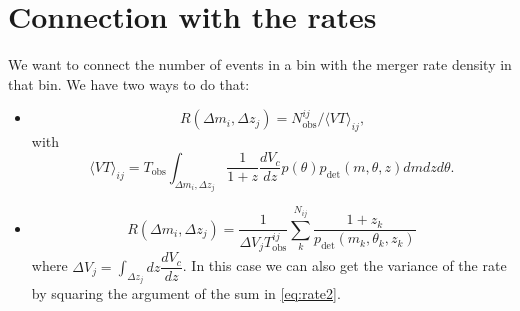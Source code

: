 \documentclass[12pt,a4paper]{article}
\begin{document}
\section{Connection with the rates}
We want to connect the number of events in a bin with the merger rate density in that bin. We have two ways to do that:
\begin{itemize}
    \item \begin{equation} \label{eq:rate}
        R(\Delta m_i, \Delta z_j) = N_\text{obs}^{ij} / \langle VT \rangle_{ij} \text{,}
    \end{equation} with \begin{equation} \label{eq:VT}
        \langle VT \rangle_{ij} = T_\text{obs} \int_{\Delta m_i, \Delta z_j} \dfrac{1}{1+z} \dfrac{dV_c}{dz} p(\theta)p_\text{det}(m, \theta, z) dm dz d\theta \text{.}
    \end{equation}
    \item \begin{equation} \label{eq:rate2}
        R(\Delta m_i, \Delta z_j) = \dfrac{1}{\Delta V_j T_\text{obs}^{ij}} \sum_k^{N_{ij}} \dfrac{1 + z_k}{p_\text{det}(m_k, \theta_k, z_k)}
    \end{equation} where \(\Delta V_j = \int_{\Delta z_j} dz \dfrac{dV_c}{dz}\). In this case we can also get the variance of the rate by squaring the argument of the sum in \eqref{eq:rate2}.
\end{itemize}
\end{document}
